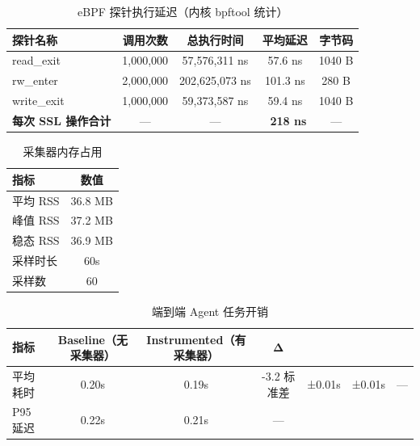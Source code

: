 \documentclass[11pt]{ctexart}
\begin{document}
\thispagestyle{empty}
\begin{table}[H]
\centering
\caption{eBPF 探针执行延迟（内核 bpftool 统计）}
\small
\begin{tabular}{lcccc}
\toprule
\textbf{探针名称} & \textbf{调用次数} & \textbf{总执行时间} & \textbf{平均延迟} & \textbf{字节码} \\
\midrule
read_exit & 1,000,000 & 57,576,311 ns & 57.6 ns & 1040 B \\
rw_enter & 2,000,000 & 202,625,073 ns & 101.3 ns & 280 B \\
write_exit & 1,000,000 & 59,373,587 ns & 59.4 ns & 1040 B \\
\textbf{每次 SSL 操作合计} & — & — & \textbf{~218 ns} & — \\
\bottomrule
\end{tabular}
\end{table}

\clearpage
\begin{table}[H]
\centering
\caption{采集器内存占用}
\small
\begin{tabular}{lc}
\toprule
\textbf{指标} & \textbf{数值} \\
\midrule
平均 RSS & 36.8 MB \\
峰值 RSS & 37.2 MB \\
稳态 RSS & 36.9 MB \\
采样时长 & 60s \\
采样数 & 60 \\
\bottomrule
\end{tabular}
\end{table}

\clearpage
\begin{table}[H]
\centering
\caption{端到端 Agent 任务开销}
\small
\begin{tabular}{lccc}
\toprule
\textbf{指标} & \textbf{Baseline（无采集器）} & \textbf{Instrumented（有采集器）} & \textbf{Δ} \\
\midrule
平均耗时 & 0.20s & 0.19s & -3.2%
标准差 & ±0.01s & ±0.01s & — \\
P95 延迟 & 0.22s & 0.21s & — \\
\bottomrule
\end{tabular}
\end{table}
\end{document}
